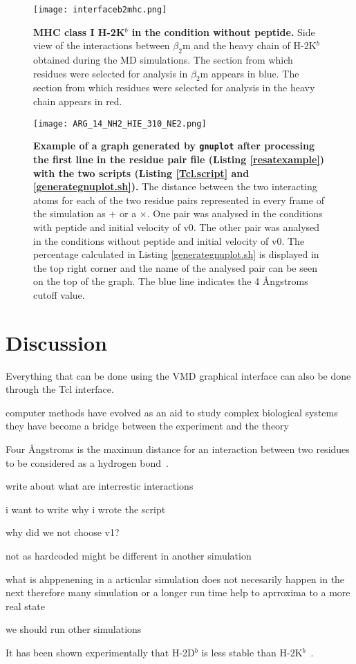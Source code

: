\documentclass[11pt,twocolumn]{article}
\def\plus{\texttt{+}}
\newcommand{\4}{four {\AA}ngstroms}
\begin{document}
\begin{figure}
\texttt{[image: interfaceb2mhc.png]}
\caption{\textbf{MHC class I H-2K$^{b}$ in the condition without peptide.} Side view of the interactions between $\beta_{2}$m and the heavy chain of H-2K$^{b}$ obtained during the MD simulations. The section from which residues were selected for analysis in $\beta_{2}$m appears in blue. The section from which residues were selected for analysis in the heavy chain appears in red.}
\label{interface}
\end{figure}



\begin{figure*}
\begin{center}
\texttt{[image: ARG\_14\_NH2\_HIE\_310\_NE2.png]}
\caption{\textbf{Example of a graph generated by \texttt{gnuplot} after processing the first line in the residue pair file (Listing \ref{resatexample}) with the two scripts (Listing \ref{Tcl.script} and \ref{generategnuplot.sh}).} The distance between the two interacting atoms for each of the two residue pairs represented in every frame of the simulation as $\plus$ or a $\times$. One pair was analysed in the conditions with peptide and initial velocity of v0. The other pair was analysed in the conditions without peptide and initial velocity of v0. The percentage calculated in Listing \ref{generategnuplot.sh} is displayed in the top right corner and the name of the analysed pair can be seen on the top of the graph. The blue line indicates the 4 {\AA}ngstroms cutoff value.}
\label{graphdemonstration}
\end{center}
\end{figure*}




\section*{Discussion}
Everything that can be done using the VMD graphical interface can also be done through the Tcl interface.

computer methods have evolved as an aid to study complex biological systems they have become a bridge between the experiment and  the theory

Four {\AA}ngstroms is the maximun distance for an interaction between two residues to be considered as a hydrogen bond~\cite{McDonald1994777}.

write about what are interrestic interactions 

i want to write why i wrote the script 

why did we not choose v1?

not as hardcoded might be different in another simulation 

what is ahppenening in a articular simulation does not necesarily happen in the next therefore many simulation or a longer run time help to aprroxima to a more real state

we should run other simulations 

It has been shown experimentally that H-2D$^{b}$ is less stable than  H-2K$^{b}$~\cite{Shields1999561}.

\pagebreak



\end{document}
